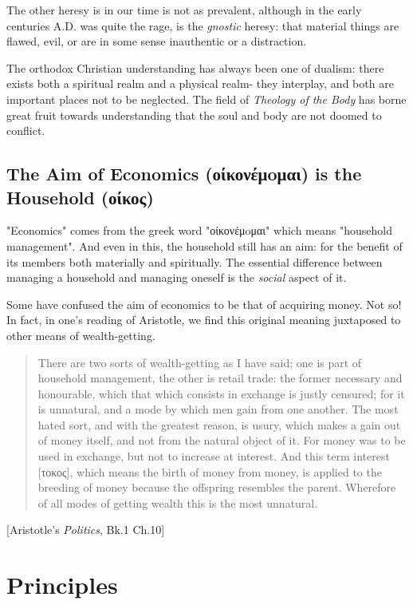 \documentclass[letterpaper]{article}
\begin{document}
The other heresy is in our time is not as prevalent, although in the early centuries A.D. was quite the rage, is the \textit{gnostic} heresy: that material things are flawed, evil, or are in some sense inauthentic or a distraction.

The orthodox Christian understanding has always been one of dualism: there exists both a spiritual realm and a physical realm- they interplay, and both are important places not to be neglected. The field of \textit{Theology of the Body} has borne great fruit towards understanding that the soul and body are not doomed to conflict.

\subsection{The Aim of Economics (οίκονέμoμαι) is the Household (οίκος)}

"Economics" comes from the greek word "οίκονέμoμαι" which means "household management". And even in this, the household still has an aim: for the benefit of its members both materially and spiritually. The essential difference between managing a household and managing oneself is the \textit{social} aspect of it.

Some have confused the aim of economics to be that of acquiring money. Not so! In fact, in one's reading of Aristotle, we find this original meaning juxtaposed to other means of wealth-getting.

\begin{quote}
  There are two sorts of wealth-getting as I have said; one is part of household management, the other is retail trade: the former necessary and honourable, which that which consists in exchange is justly censured; for it is unnatural, and a mode by which men gain from one another. The most hated sort, and with the greatest reason, is usury, which makes a gain out of money itself, and not from the natural object of it. For money was to be used in exchange, but not to increase at interest. And this term interest [τοκος], which means the birth of money from money, is applied to the breeding of money because the offspring resembles the parent. Wherefore of all modes of getting wealth this is the most unnatural.
\end{quote} [Aristotle's \textit{Politics}, Bk.1 Ch.10]

\section{Principles}
\end{document}

